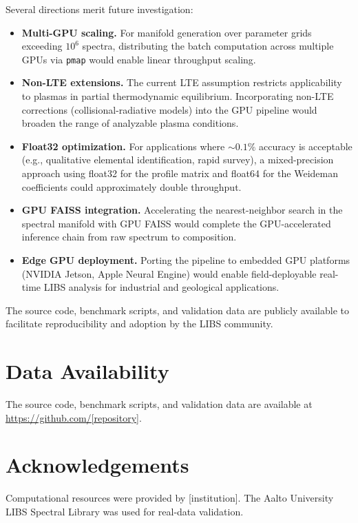 \documentclass[preprint,12pt,authoryear]{elsarticle}
\begin{document}
Several directions merit future investigation:
\begin{itemize}
  \item \textbf{Multi-GPU scaling.} For manifold generation over parameter grids exceeding $10^6$ spectra, distributing the batch computation across multiple GPUs via \texttt{pmap} would enable linear throughput scaling.
  \item \textbf{Non-LTE extensions.} The current LTE assumption restricts applicability to plasmas in partial thermodynamic equilibrium. Incorporating non-LTE corrections (collisional-radiative models) into the GPU pipeline would broaden the range of analyzable plasma conditions.
  \item \textbf{Float32 optimization.} For applications where $\sim 0.1\%$ accuracy is acceptable (e.g., qualitative elemental identification, rapid survey), a mixed-precision approach using float32 for the profile matrix and float64 for the Weideman coefficients could approximately double throughput.
  \item \textbf{GPU FAISS integration.} Accelerating the nearest-neighbor search in the spectral manifold with GPU FAISS would complete the GPU-accelerated inference chain from raw spectrum to composition.
  \item \textbf{Edge GPU deployment.} Porting the pipeline to embedded GPU platforms (NVIDIA Jetson, Apple Neural Engine) would enable field-deployable real-time LIBS analysis for industrial and geological applications.
\end{itemize}

The source code, benchmark scripts, and validation data are publicly available to facilitate reproducibility and adoption by the LIBS community.

\section*{Data Availability}

The source code, benchmark scripts, and validation data are available at \url{https://github.com/[repository]}.

\section*{Acknowledgements}

Computational resources were provided by [institution]. The Aalto University LIBS Spectral Library was used for real-data validation.


\end{document}

